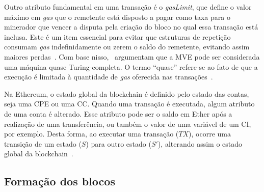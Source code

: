 Outro atributo fundamental em uma transação é o \textit{gasLimit}, que define o valor máximo em \textit{gas} que o remetente está disposto a pagar como taxa para o minerador que vencer a disputa pela criação do bloco no qual essa transação está inclusa. Este é um item essencial para evitar que estruturas de repetição consumam \textit{gas} indefinidamente ou zerem o saldo do remetente, evitando assim maiores perdas~\cite{wood2014ethereum-yellow-paper}. Com base nisso,~ argumentam que a MVE pode ser considerada uma máquina quase Turing-completa. O termo ``quase'' refere-se ao fato de que a execução é limitada à quantidade de \textit{gas} oferecida nas transações~\cite{overview-chen2020blockchain-graph}.

Na Ethereum, o estado global da blockchain é definido pelo estado das contas, seja uma CPE ou uma CC. Quando uma transação é executada, algum atributo de uma conta é alterado. Esse atributo pode ser o saldo em Ether após a realização de uma transferência, ou também o valor de uma variável de um CI, por exemplo. Desta forma, ao executar uma transação ($TX$), ocorre uma transição de um estado ($S$) para outro estado ($S'$), alterando assim o estado global da blockchain~\cite{ethereum2014whitepaper}.



\subsection{Formação dos blocos} \label{tex:fund:ethereum:blocos}

